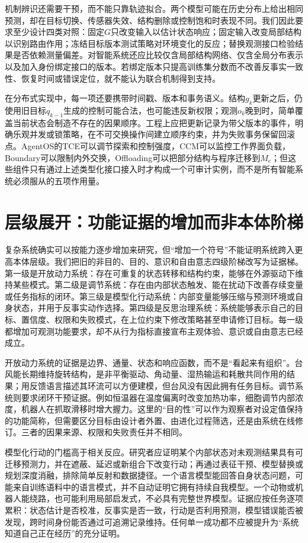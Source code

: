 机制辨识还需要干预，而不能只靠轨迹拟合。两个模型可能在历史分布上给出相同预测，却在目标切换、传感器失效、结构删除或控制饱和时表现不同。我们因此要求至少设计四类对照：固定$G$只改变输入以估计状态响应；固定输入改变局部结构以识别路由作用；冻结目标版本测试策略对环境变化的反应；替换观测接口检验结果是否依赖测量偏差。对智能系统还应比较仅含局部结构网络、仅含全局分布表示以及加入身份绑定接口的版本。若绑定版本只提高训练集分数而不改善反事实一致性、恢复时间或错误定位，就不能认为联合机制得到支持。

在分布式实现中，每一项还要携带时间戳、版本和事务语义。结构$g_k$更新之后，仍使用旧目标$q_{k-1}$生成的控制可能合法，也可能违反新权限；观测$o_k$晚到时，简单覆盖当前状态会制造不存在的因果顺序。工程上应把更新记录为带父版本的事件，明确乐观并发或锁策略，在不可交换操作间建立顺序约束，并为失败事务保留回滚点。AgentOS的TCE可以调节探索和控制强度，CCM可以监控工作界面负载，Boundary可以限制内外交换，Offloading可以把部分结构与程序迁移到$M_e$；但这些组件只有通过上述类型化接口接入时才构成一个可审计实例，而不是所有智能系统必须服从的五项作用量。

\section{层级展开：功能证据的增加而非本体阶梯}
\label{sec:hierarchical_unfolding}

复杂系统确实可以按能力逐步增加来研究，但“增加一个符号”不能证明系统跨入更高本体层级。我们把旧的非目的、目的、意识和自由意志四级阶梯改写为证据梯。第一级是开放动力系统：存在可重复的状态转移和结构约束，能够在外源驱动下维持某些模式。第二级是调节系统：存在由内部状态触发、能在扰动下改善存续变量或任务指标的闭环。第三级是模型化行动系统：内部变量能够压缩与预测环境或自身状态，并用于反事实动作选择。第四级是反思治理系统：系统能够表示自己的目标、置信度、权限和失败模式，在上位约束下修改策略甚至申请修订目标。每一级都增加可观测功能要求，却不从行为指标直接宣布主观体验、意识或自由意志已经成立。

开放动力系统的证据是边界、通量、状态和响应函数，而不是“看起来有组织”。台风能长期维持旋转结构，是非平衡驱动、角动量、湿热输运和耗散共同作用的结果；用反馈语言描述其环流可以方便建模，但台风没有因此拥有任务目标。调节系统则要求闭环干预证据。例如恒温器在温度偏离时改变加热功率，细胞调节内部浓度，机器人在抓取滑移时增大握力。这里的“目的性”可以作为观察者对设定值保持的功能简称，但需要区分目标由设计者外置、由进化过程筛选，还是由系统在线修订。三者的因果来源、权限和失败责任并不相同。

模型化行动的门槛高于相关反应。研究者应证明某个内部状态对未观测结果具有可迁移预测力，并在遮蔽、延迟或新组合下改变行动；再通过表征干预、模型替换或规划深度消融，排除简单反射和数据捷径。一个语言模型能回答自身状态问题，可能来自训练语料中的语言模式，并不自动证明它拥有持续自我模型。一个动物或机器人能绕路，也可能利用局部启发式，不必具有完整世界模型。证据应按任务逐项累积：状态估计是否校准，反事实是否一致，行动是否利用预测，模型错误能否被发现，跨时间身份能否通过可追溯记录维持。任何单一成功都不应被提升为“系统知道自己正在经历”的充分证明。

